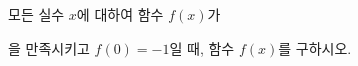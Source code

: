 모든 실수 $x$에 대하여 함수 $f(x)$가\par\smallskip{}\par\smallskip\noindent 을 만족시키고 $f(0)=-1$일 때, 함수 $f(x)$를 구하시오.
